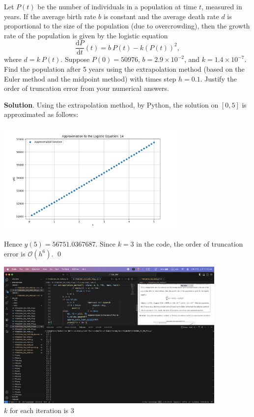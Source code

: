 \documentclass[11pt]{article}
\theoremstyle{break}
\newcommand{\dd}{\text{d}}
\numberwithin{equation}{theorem}
\begin{document}
\newpage
\begin{problem}\label{problem 14} %
    Let $P(t)$ be the number of individuals in a population at time $t$, measured in years. If the average birth rate $b$ is constant and the average death rate $d$ is proportional to the size of the population (due to overcrowding), then the growth rate of the population is given by the logistic equation $$\dfrac{\dd P}{\dd t}(t)=b\:P(t)-k(P(t))^2,$$ where $d=k\:P(t)$. Suppose $P(0)=50976$, $b=2.9\times10^{-2}$, and $k=1.4\times 10^{-7}$. Find the population after 5 years using the extrapolation method (based on the Euler method and the midpoint method) with times step $h=0.1$. Justify the order of truncation error from your numerical answers.
\end{problem}
\textbf{Solution}. Using the extrapolation method, by Python, the solution on $[0, 5]$ is approximated as follows:

\begin{center}
    \includegraphics[width=0.7\textwidth]{P14.png}
\end{center} 

Hence $y(5)=56751.0367687$. Since $k=3$ in the code, the order of truncation error is $\mathcal{O}(h^6)$. \qed

\begin{center}
    \includegraphics[width=0.85\textwidth]{P14 k.png}\\
    $k$ for each iteration is 3
\end{center}
\end{document}
